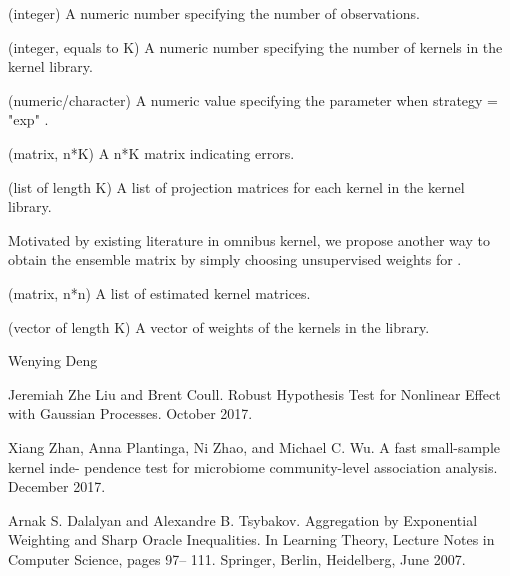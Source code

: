 \documentclass[a4paper]{book}
\begin{document}
%
\begin{Arguments}
\begin{ldescription}
\item[\code{n}] (integer) A numeric number specifying the number of observations.

\item[\code{kern\_size}] (integer, equals to K) A numeric number specifying the
number of kernels in the kernel library.

\item[\code{beta\_exp}] (numeric/character) A numeric value specifying the parameter
when strategy = "exp" .

\item[\code{error\_mat}] (matrix, n*K) A n\bsl{}*K matrix indicating errors.

\item[\code{A\_hat}] (list of length K) A list of projection matrices for each
kernel in the kernel library.
\end{ldescription}
\end{Arguments}
%
\begin{Details}\relax
{}

Motivated by existing literature in omnibus kernel, we propose another way
to obtain the ensemble matrix by simply choosing unsupervised weights
 for .
\end{Details}
%
\begin{Value}
\begin{ldescription}
\item[\code{A\_est}] (matrix, n*n) A list of estimated kernel matrices.

\item[\code{u\_hat}] (vector of length K) A vector of weights of the kernels in the
library.
\end{ldescription}
\end{Value}
%
\begin{Author}\relax
Wenying Deng
\end{Author}
%
\begin{References}\relax
Jeremiah Zhe Liu and Brent Coull. Robust Hypothesis Test for
Nonlinear Effect with Gaussian Processes. October 2017.

Xiang Zhan, Anna Plantinga, Ni Zhao, and Michael C. Wu. A fast small-sample
kernel inde- pendence test for microbiome community-level association
analysis. December 2017.

Arnak S. Dalalyan and Alexandre B. Tsybakov. Aggregation by Exponential
Weighting and Sharp Oracle Inequalities. In Learning Theory, Lecture Notes
in Computer Science, pages 97– 111. Springer, Berlin, Heidelberg, June 2007.
\end{References}
\end{document}
